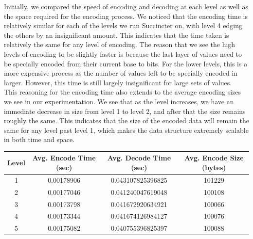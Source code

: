 \documentclass{article}
\begin{document}
Initially, we compared the speed of encoding and decoding at each level as well as the space required for the encoding process. We noticed that the encoding time is relatively similar for each of the levels we run Succincter on, with level 4 edging the others by an insignificant amount. This indicates that the time taken is relatively the same for any level of encoding. The reason that we see the high levels of encoding to be slightly faster is because the last layer of values need to be specially encoded from their current base to bits. For the lower levels, this is a more expensive process as the number of values left to be specially encoded in larger. However, this time is still largely insignificant for large sets of values. \\

This reasoning for the encoding time also extends to the average encoding sizes we see in our experimentation. We see that as the level increases, we have an immediate decrease in size from level 1 to level 2, and after that the size remains roughly the same. This indicates that the size of the encoded data will remain the same for any level past level 1, which makes the data structure extremely scalable in both time and space. 

\begin{center}\smallskip
    \begin{tabular}{ | c | c | c | c |}
    \hline
    Level & Avg. Encode Time (sec) & Avg. Decode Time (sec) & Avg. Encode Size (bytes) \\ \hline
    1 & 0.00178906 & 0.043107825396825 & 101229\\
    2 & 0.00177046 & 0.041240047619048 & 100108\\
    3 & 0.00173798 & 0.041672920634921 & 100066\\
    4 & 0.00173344 & 0.041674126984127 & 100076\\
    5 & 0.00175082 & 0.040755396825397 & 100088\\ \hline
    \end{tabular}
\end{center}
\end{document}
